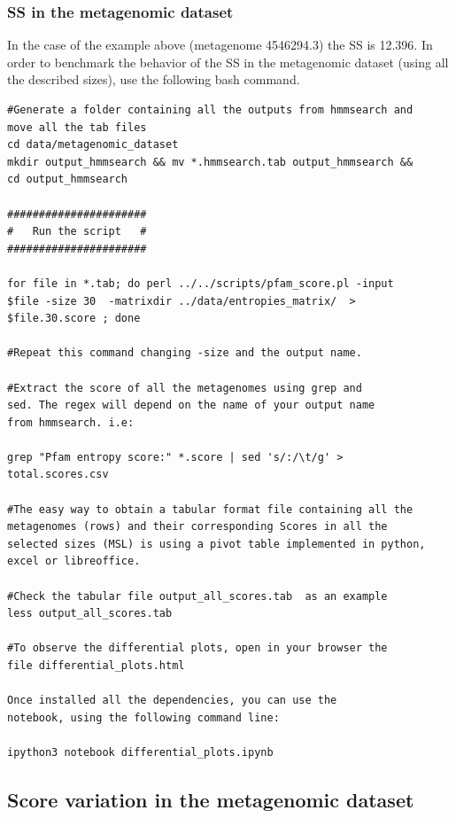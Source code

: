 \documentclass[12pt]{report}
\begin{document}
\subsubsection{SS in the metagenomic dataset}

In the case of the example above (metagenome 4546294.3) the SS is 12.396. In
order to benchmark the behavior of the SS in the metagenomic dataset (using all
the described sizes), use the following bash command. 

\begin{verbatim}
#Generate a folder containing all the outputs from hmmsearch and 
move all the tab files  
cd data/metagenomic_dataset
mkdir output_hmmsearch && mv *.hmmsearch.tab output_hmmsearch && 
cd output_hmmsearch 

######################
#   Run the script   #
######################

for file in *.tab; do perl ../../scripts/pfam_score.pl -input 
$file -size 30  -matrixdir ../data/entropies_matrix/  > 
$file.30.score ; done 

#Repeat this command changing -size and the output name. 

#Extract the score of all the metagenomes using grep and 
sed. The regex will depend on the name of your output name 
from hmmsearch. i.e:

grep "Pfam entropy score:" *.score | sed 's/:/\t/g' > 
total.scores.csv 

#The easy way to obtain a tabular format file containing all the 
metagenomes (rows) and their corresponding Scores in all the 
selected sizes (MSL) is using a pivot table implemented in python, excel or libreoffice.

#Check the tabular file output_all_scores.tab  as an example 
less output_all_scores.tab

#To observe the differential plots, open in your browser the 
file differential_plots.html

Once installed all the dependencies, you can use the 
notebook, using the following command line:

ipython3 notebook differential_plots.ipynb

\end{verbatim}
\subsection{Score variation in the metagenomic dataset }
\end{document}
